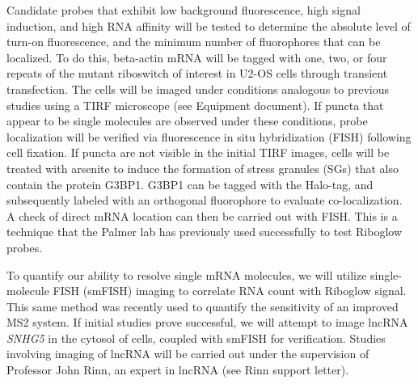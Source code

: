 Candidate probes that exhibit low background fluorescence, high signal induction, and high RNA affinity will be tested to determine the absolute level of turn-on fluorescence, and the minimum number of fluorophores that can be localized. To do this, beta-actin mRNA will be tagged with one, two, or four repeats of the mutant riboswitch of interest in U2-OS cells through transient transfection. The cells will be imaged under conditions analogous to previous studies\cite{KatzMappingtranslationhotspots2016} using a TIRF microscope (see Equipment document). If puncta that appear to be single molecules are observed under these conditions, probe localization will be verified via fluorescence in situ hybridization (FISH) following cell fixation. If puncta are not visible in the initial TIRF images, cells will be treated with arsenite to induce the formation of stress granules (SGs) that also contain the protein G3BP1\cite{ZurlaCharacterizingmRNAInteractions2011,JainATPaseModulatedStressGranules2016,NellesProgrammableRNATracking2016}.
G3BP1 can be tagged with the Halo-tag, and subsequently labeled with an orthogonal fluorophore to evaluate co-localization. A check of direct mRNA location can then be carried out with FISH.
This is a technique that the Palmer lab has previously used successfully to test Riboglow probes\cite{BraselmannDevelopmentriboswitchbasedplatform2017}.

To quantify our ability to resolve single mRNA molecules, we will utilize single-molecule FISH (smFISH) imaging to correlate RNA count with Riboglow signal\cite{MuellerFISHquantautomaticcounting2013}. This same method was recently used to quantify the sensitivity of an improved MS2 system\cite{TutucciimprovedMS2system2018}. If initial studies prove successful, we will attempt to image lncRNA \textit{SNHG5} in the cytosol of cells, coupled with smFISH for verification.
Studies involving imaging of lncRNA will be carried out under the supervision of Professor John Rinn, an expert in lncRNA (see Rinn support letter).

